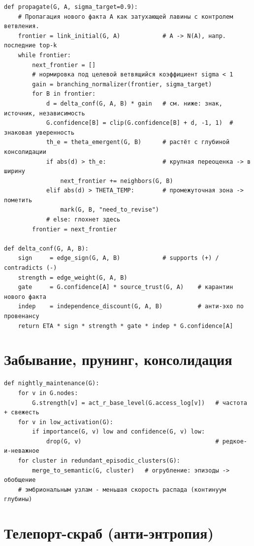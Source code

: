 \begin{lstlisting}[style=pseudo]
def propagate(G, A, sigma_target=0.9):
    # Пропагация нового факта A как затухающей лавины с контролем ветвления.
    frontier = link_initial(G, A)            # A -> N(A), напр. последние top-k
    while frontier:
        next_frontier = []
        # нормировка под целевой ветвящийся коэффициент sigma < 1
        gain = branching_normalizer(frontier, sigma_target)
        for B in frontier:
            d = delta_conf(G, A, B) * gain   # см. ниже: знак, источник, независимость
            G.confidence[B] = clip(G.confidence[B] + d, -1, 1)  # знаковая уверенность
            th_e = theta_emergent(G, B)      # растёт с глубиной консолидации
            if abs(d) > th_e:                # крупная переоценка -> в ширину
                next_frontier += neighbors(G, B)
            elif abs(d) > THETA_TEMP:        # промежуточная зона -> пометить
                mark(G, B, "need_to_revise")
            # else: глохнет здесь
        frontier = next_frontier

def delta_conf(G, A, B):
    sign     = edge_sign(G, A, B)            # supports (+) / contradicts (-)
    strength = edge_weight(G, A, B)
    gate     = G.confidence[A] * source_trust(G, A)    # карантин нового факта
    indep    = independence_discount(G, A, B)          # анти-эхо по провенансу
    return ETA * sign * strength * gate * indep * G.confidence[A]
\end{lstlisting}

\section{Забывание, прунинг, консолидация}

\begin{lstlisting}[style=pseudo]
def nightly_maintenance(G):
    for v in G.nodes:
        G.strength[v] = act_r_base_level(G.access_log[v])   # частота + свежесть
    for v in low_activation(G):
        if importance(G, v) low and confidence(G, v) low:
            drop(G, v)                                      # редкое-и-неважное
    for cluster in redundant_episodic_clusters(G):
        merge_to_semantic(G, cluster)   # огрубление: эпизоды -> обобщение
    # эмбриональным узлам - меньшая скорость распада (континуум глубины)
\end{lstlisting}

\section{Телепорт-скраб (анти-энтропия)}


